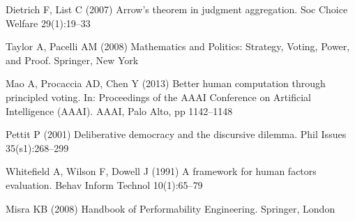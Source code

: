 \documentclass[11pt]{bmc_article_s50}
\begin{document}
\begin{thebibliography}{000}
Dietrich F,
List C (2007)
{Arrow's theorem in judgment aggregation}.
{Soc Choice Welfare}
{29}(1):19--{33}


Taylor A,
Pacelli AM (2008)
{Mathematics and Politics: Strategy, Voting, Power, and Proof}.
{Springer},
{New York}



Mao A,
Procaccia AD,
Chen Y (2013)
{Better human computation through principled voting}.
In: {Proceedings of the AAAI Conference on Artificial Intelligence
  (AAAI)}.
{AAAI},
{Palo Alto},
pp 1142--{1148}

Pettit P (2001)
{Deliberative democracy and the discursive dilemma.}
{Phil Issues}
{35}(s1):268--{299}



Whitefield A,
Wilson F,
Dowell J (1991)
{A framework for human factors evaluation}.
{Behav Inform Technol}
{10}(1):65--{79}



Misra KB (2008)
{Handbook of Performability Engineering}.
{Springer},
{London}



\end{thebibliography}
\end{document}
